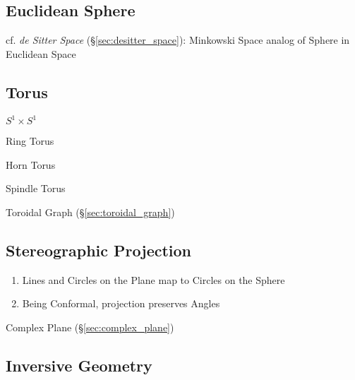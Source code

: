 \subsection{Euclidean Sphere}\label{sec:euclidean_sphere}

cf. \emph{de Sitter Space} (\S\ref{sec:desitter_space}): Minkowski Space analog
of Sphere in Euclidean Space



\subsection{Torus}\label{sec:torus}

$S^1 \times S^1$

Ring Torus

Horn Torus

Spindle Torus

\fist Toroidal Graph (\S\ref{sec:toroidal_graph})



\subsection{Stereographic Projection}\label{sec:stereographic_projection}

\begin{enumerate}
  \item Lines and Circles on the Plane map to Circles on the Sphere
  \item Being Conformal, projection preserves Angles
\end{enumerate}

Complex Plane (\S\ref{sec:complex_plane})



\subsection{Inversive Geometry}\label{sec:inversive_geometry}

